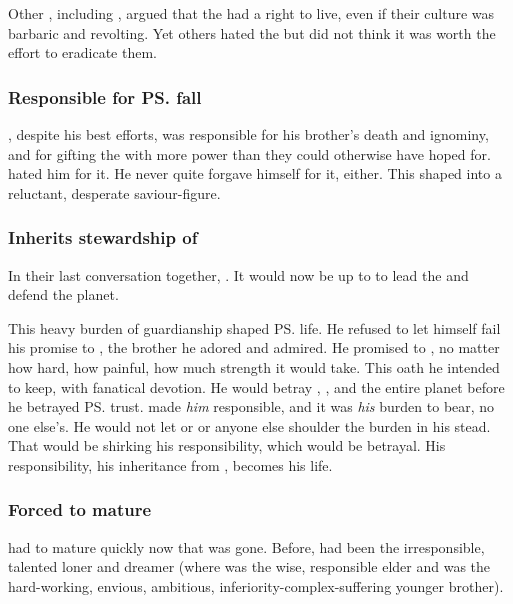 Other \dragons, including \Rystessakhin, argued that the \humans had a right to live, even if their culture was barbaric and revolting. 
Yet others hated the \humans but did not think it was worth the effort to eradicate them. 





\subsubsection{Responsible for \ps{\Nexagglachel} fall}
\Ishnaruchaefir{}, despite his best efforts, was responsible for his brother's death and ignominy, and for gifting the \resphain{} with more power than they could otherwise have hoped for. 
\HriistD{} hated him for it.
He never quite forgave himself for it, either. 
This shaped \Ishnaruchaefir{} into a reluctant, desperate saviour-figure.





\subsubsection{Inherits stewardship of \Miith}
In their last conversation together, \Nexagglachel{} . 
It would now be up to \Ishnaruchaefir{} to lead the \dragons{} and defend the planet. 

This heavy burden of guardianship shaped \ps{\Ishnaruchaefir} life. 
He refused to let himself fail his promise to \Nexagglachel, the brother he adored and admired. 
He promised to , no matter how hard, how painful, how much strength it would take. 
This oath he intended to keep, with fanatical devotion. 
He would betray \Rystessakhin, \Secherdamon, \Nzessuacrith{} and the entire planet before he betrayed \ps{\Nexagglachel} trust. 
\Nexagglachel{} made \emph{him} responsible, and it was \emph{his} burden to bear, no one else's. 
He would not let \Rystessakhin{} or \Secherdamon{} or anyone else shoulder the burden in his stead. 
That would be shirking his responsibility, which would be betrayal. 
His responsibility, his inheritance from \Nexagglachel, becomes his life. 





\subsubsection{Forced to mature}
\Ishnaruchaefir had to mature quickly now that \Nexagglachel was gone. 
Before, \Ishnaruchaefir had been the irresponsible, talented loner and dreamer (where \Nexagglachel was the wise, responsible elder and \Secherdamon was the hard-working, envious, ambitious, inferiority-complex-suffering younger brother). 

